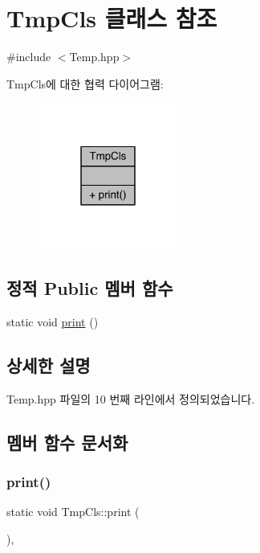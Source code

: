 \hypertarget{class_tmp_cls}{}\section{Tmp\+Cls 클래스 참조}
\label{class_tmp_cls}


{\ttfamily \#include $<$Temp.\+hpp$>$}



Tmp\+Cls에 대한 협력 다이어그램\+:
\nopagebreak
\begin{figure}[H]
\begin{center}
\leavevmode
\includegraphics[width=130pt]{da/d05/class_tmp_cls__coll__graph}
\end{center}
\end{figure}
\subsection*{정적 Public 멤버 함수}
\begin{DoxyCompactItemize}
\item 
static void \hyperlink{class_tmp_cls_a1f0f7804e9a13c4a3e34f697ec2a49d5}{print} ()
\end{DoxyCompactItemize}


\subsection{상세한 설명}


Temp.\+hpp 파일의 10 번째 라인에서 정의되었습니다.



\subsection{멤버 함수 문서화}
\mbox{\label{class_tmp_cls_a1f0f7804e9a13c4a3e34f697ec2a49d5}} 
\subsubsection{\texorpdfstring{print()}{print()}}
{\footnotesize\ttfamily static void Tmp\+Cls\+::print (\begin{DoxyParamCaption}{ }\end{DoxyParamCaption})\hspace{0.3cm}{\ttfamily [inline]}, {\ttfamily [static]}}



